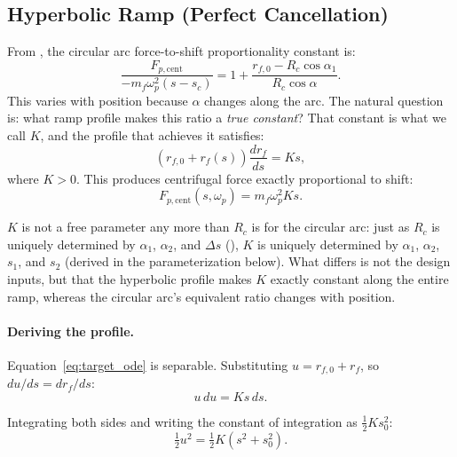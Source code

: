 \documentclass[11pt]{article}
\numberwithin{equation}{section}
\begin{document}
\subsection{Hyperbolic Ramp (Perfect Cancellation)}
\label{sec:ramp_hyperbolic}

From , the circular arc force-to-shift proportionality
constant is:
\begin{equation}
\frac{F_{p,\mathrm{cent}}}{-m_f\omega_p^2(s-s_c)}
= 1 + \frac{r_{f,0} - R_c\cos\alpha_1}{R_c\cos\alpha}.
\end{equation}
This varies with position because $\alpha$ changes along the arc. The natural
question is: what ramp profile makes this ratio a \emph{true constant}?
That constant is what we call $K$, and the profile that achieves it satisfies:
\begin{equation}
(r_{f,0} + r_f(s))\frac{dr_f}{ds} = K s,
\label{eq:target_ode}
\end{equation}
where $K > 0$. This produces centrifugal force exactly proportional to shift:
\begin{equation}
F_{p,\mathrm{cent}}(s,\omega_p)
= m_f \omega_p^2 K s.
\label{eq:target_force}
\end{equation}

$K$ is not a free parameter any more than $R_c$ is for the circular arc: just
as $R_c$ is uniquely determined by $\alpha_1$, $\alpha_2$, and $\Delta s$
(), $K$ is uniquely determined by $\alpha_1$, $\alpha_2$,
$s_1$, and $s_2$ (derived in the parameterization below). What differs is not
the design inputs, but that the hyperbolic profile makes $K$ exactly constant
along the entire ramp, whereas the circular arc's equivalent ratio changes
with position.

\paragraph{Deriving the profile.}

Equation~\eqref{eq:target_ode} is separable. Substituting $u = r_{f,0} + r_f$,
so $du/ds = dr_f/ds$:
\begin{equation}
u \, du = K s \, ds.
\end{equation}

Integrating both sides and writing the constant of integration as
$\tfrac{1}{2}K s_0^2$:
\begin{equation}
\tfrac{1}{2}u^2 = \tfrac{1}{2}K(s^2 + s_0^2).
\end{equation}
\end{document}
